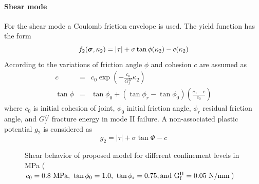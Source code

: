 \documentclass[epsf,a4paper]{article}
\newcommand{\mbf}[1]{\mbox{\boldmath$#1$}}
\newcommand{\del}[2]{\mbox{$\displaystyle\frac{#1}{#2}$}}
\newcommand{\sig}{\mbf{\sigma}}
\begin{document}
\paragraph{Shear mode}
For the shear mode a Coulomb friction envelope is used. The yield function has the form
\begin{equation}
  f_2(\sig,\kappa_2) = \vert\tau\vert+\sigma\tan\phi(\kappa_2)-c(\kappa_2)
\end{equation}
According to \cite{Rots} the variations of friction angle $\phi$ and cohesion $c$ are assumed as
\begin{eqnarray}
  \label{c}
  c&=&c_0\exp\left(-\del{c_0}{G^{II}_f}\kappa_2\right)\\
  \tan\phi&=&\tan\phi_0+(\tan\phi_r-\tan\phi_0)\left(\del{c_0-c}{c_0}\right)
\end{eqnarray}
where $c_0$ is initial cohesion of joint, $\phi_0$ initial friction angle, $\phi_r$ residual friction angle, and $G^{II}_f$ fracture energy in mode II failure. A non-associated plastic potential $g_2$ is considered as
\begin{equation}
  g_2=\vert\tau\vert+\sigma\tan\Phi-c
\end{equation}
\begin{figure}
  \centerline{}
  \caption{Shear behavior of proposed model for different confinement levels in MPa ($c_0=0.8\ \rm{MPa},\ \tan\phi_0=1.0,\ \tan\phi_r=0.75,{\rm and}\ G_f^{II}=0.05\ {N/mm}$)}
\end{figure}
\end{document}
